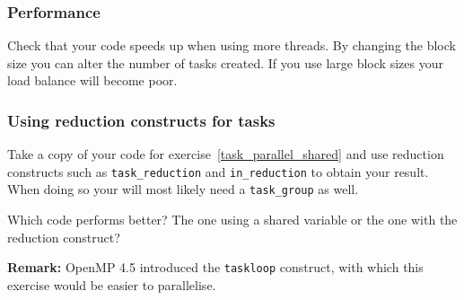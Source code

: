 \subsubsection{Performance}
Check that your code speeds up when using more threads.  By changing the block size you can alter the number of tasks created.  If you use large block sizes your load balance will become poor.  
\subsubsection{Using reduction constructs for tasks}\label{taskreduction}
Take a copy of your code for exercise~\ref{task_parallel_shared} and use reduction constructs such as \verb+task_reduction+ and \verb+in_reduction+ to obtain your result.  When doing so your will most likely need a \verb+task_group+ as well.

Which code performs better?   The one using a shared variable or the one with the reduction construct?

\textbf{Remark:}
OpenMP 4.5 introduced the \verb+taskloop+ construct, with which this exercise would be easier to parallelise.

